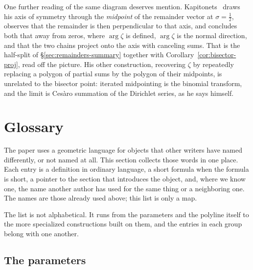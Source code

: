 \documentclass[11pt]{article}
\theoremstyle{definition}
\begin{document}
One further reading of the same diagram deserves mention.
Kapitonets~\cite{Kapitonets2019} draws his axis of symmetry through the
\emph{midpoint} of the remainder vector at $\sigma=\tfrac12$, observes that the
remainder is then perpendicular to that axis, and concludes both that
away from zeros, where $\arg\zeta$ is defined, $\arg\zeta$ is the normal
direction, and that the two chains project onto the axis
with canceling sums. That is the half-split of
\S\ref{sec:remainders-summary} together with Corollary~\ref{cor:bisector-proj},
read off the picture. His other construction,
recovering $\zeta$ by repeatedly replacing a polygon of partial sums by the
polygon of their midpoints, is unrelated to the bisector point: iterated
midpointing is the binomial transform, and the limit is Ces\`aro summation of the
Dirichlet series, as he says himself.

\clearpage

\section{Glossary}\label{sec:glossary}

The paper uses a geometric language for objects that other writers have
named differently, or not named at all. This section collects those words
in one place. Each entry is a definition in ordinary language, a short
formula when the formula is short, a pointer to the section that
introduces the object, and, where we know one, the name another author
has used for the same thing or a neighboring one. The names are those
already used above; this list is only a map.

The list is not alphabetical. It runs from the parameters and the
polyline itself to the more specialized constructions built on them,
and the entries in each group belong with one another.

\subsection*{The parameters}
\end{document}
